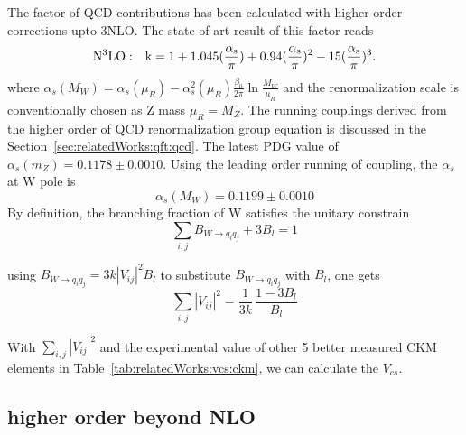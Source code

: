 \noindent The factor of QCD contributions has been calculated with higher order corrections upto 3NLO. The state-of-art result of this factor reads 
\begin{equation}
	\rm{N^3LO:} \quad k = 1+1.045 ( \frac{\alpha_s}{\pi} ) + 0.94  ( \frac{\alpha_s}{\pi} ) ^2 -15  ( \frac{\alpha_s}{\pi} ) ^3.
\end{equation}
\noindent where $\alpha_s(M_W) = \alpha_s(\mu_R) - \alpha^2_s(\mu_R) \frac{ \beta_0}{2\pi} \ln \frac{M_W}{\mu_R}$ and the renormalization scale is conventionally chosen as Z mass $\mu_R=M_Z$. The running couplings derived from the higher order of QCD renormalization group equation is discussed in the Section~\ref{sec:relatedWorks:qft:qcd}. The latest PDG value of $\alpha_s(m_Z)=0.1178\pm0.0010$. Using the leading order running of coupling, the $\alpha_s$ at W pole is
\begin{equation}
	\alpha_s(M_W) = 0.1199 \pm 0.0010
\end{equation}
By definition, the branching fraction of W satisfies the unitary constrain
\begin{equation}
    \sum_{ i,j } B_{W \to q_i q_j} + 3 B_l = 1
\end{equation}

\noindent using  $B_{W \to q_i q_j} = 3 k |V_{ij}|^2 B_l $ to substitute $B_{W \to q_i q_j}$  with $B_l$, one gets
\begin{equation}
    \sum_{ i,j } |V_{ij}|^2 = \frac{1}{ 3k} \, \frac{1-3B_l}{B_l}
\end{equation}



\noindent  With $\sum_{ i,j } |V_{ij}|^2$ and the experimental value of other 5 better measured CKM elements \cite{pdg2020} in Table~\ref{tab:relatedWorks:vcs:ckm}, we can calculate the $V_{cs}$.



\subsection{higher order beyond NLO}
